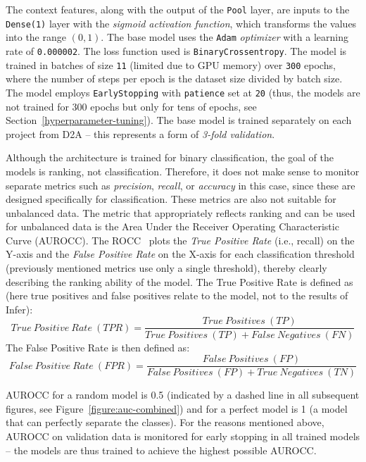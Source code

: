 The context features, along with the output of the \texttt{Pool} layer, are inputs to the \texttt{Dense(1)} layer with the \textit{sigmoid activation function}, which transforms the values into the range $(0,1)$. The base model uses the \texttt{Adam} \textit{optimizer} with a learning rate of \texttt{0.000002}. The loss function used is \texttt{BinaryCrossentropy}. The model is trained in batches of size \texttt{11} (limited due to GPU memory) over \texttt{300} epochs, where the number of steps per epoch is the dataset size divided by batch size. The model employs \texttt{EarlyStopping} with \texttt{patience} set at \texttt{20} (thus, the models are not trained for 300 epochs but only for tens of epochs, see Section~\ref{hyperparameter-tuning}). The base model is trained separately on each project from D2A -- this represents a form of \textit{3-fold validation}.

Although the architecture is trained for binary classification, the goal of the models is ranking, not classification. Therefore, it does not make sense to monitor separate metrics such as \textit{precision}, \textit{recall}, or \textit{accuracy} in this case, since these are designed specifically for classification. These metrics are also not suitable for unbalanced data. The metric that appropriately reflects ranking and can be used for unbalanced data is the Area Under the Receiver Operating Characteristic Curve (AUROCC). The ROCC~\cite{aurocc} plots the \textit{True Positive Rate} (i.e., recall) on the Y-axis and the \textit{False Positive Rate} on the X-axis for each classification threshold (previously mentioned metrics use only a single threshold), thereby clearly describing the ranking ability of the model. The True Positive Rate is defined as (here true positives and false positives relate to the model, not to the results of Infer):
\begin{equation*}
True\:Positive\:Rate\:(TPR) = \frac{True\:Positives\:(TP)}{True\:Positives\:(TP) + False\:Negatives\:(FN)}
\end{equation*}
The False Positive Rate is then defined as:
\begin{equation*}
False\:Positive\:Rate\:(FPR) = \frac{False\:Positives\:(FP)}{False\:Positives\:(FP) + True\:Negatives\:(TN)}
\end{equation*}

AUROCC for a random model is 0.5 (indicated by a dashed line in all subsequent figures, see Figure~\ref{figure:auc-combined}) and for a perfect model is 1 (a model that can perfectly separate the classes). For the reasons mentioned above, AUROCC on validation data is monitored for early stopping in all trained models -- the models are thus trained to achieve the highest possible AUROCC.

